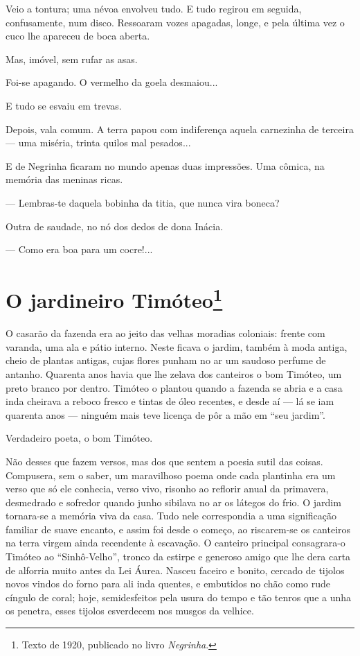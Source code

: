 Veio a tontura; uma névoa envolveu tudo. E tudo regirou em seguida,
confusamente, num disco. Ressoaram vozes apagadas, longe, e pela última
vez o cuco lhe apareceu de boca aberta.

Mas, imóvel, sem rufar as asas.

Foi-se apagando. O vermelho da goela desmaiou...

E tudo se esvaiu em trevas.

Depois, vala comum. A terra papou com indiferença aquela carnezinha de
terceira --- uma miséria, trinta quilos mal pesados...

E de Negrinha ficaram no mundo apenas duas impressões. Uma cômica, na
memória das meninas ricas.

--- Lembras-te daquela bobinha da titia, que nunca vira boneca?

Outra de saudade, no nó dos dedos de dona Inácia.

--- Como era boa para um cocre!...

\chapter{O jardineiro Timóteo\footnote[*]{Texto de 1920, publicado no livro \emph{Negrinha}.}}


O casarão da fazenda era ao jeito das velhas moradias coloniais: frente
com varanda, uma ala e pátio interno. Neste ficava o jardim, também à
moda antiga, cheio de plantas antigas, cujas flores punham no ar um
saudoso perfume de antanho. Quarenta anos havia que lhe zelava dos
canteiros o bom Timóteo, um preto branco por dentro. Timóteo o plantou
quando a fazenda se abria e a casa inda cheirava a reboco fresco e
tintas de óleo recentes, e desde aí --- lá se iam quarenta anos ---
ninguém mais teve licença de pôr a mão em ``seu jardim''.

Verdadeiro poeta, o bom Timóteo.

Não desses que fazem versos, mas dos que sentem a poesia sutil das
coisas. Compusera, sem o saber, um maravilhoso poema onde cada plantinha
era um verso que só ele conhecia, verso vivo, risonho ao reflorir anual
da primavera, desmedrado e sofredor quando junho sibilava no ar os
látegos do frio. O jardim tornara-se a memória viva da casa. Tudo nele
correspondia a uma significação familiar de suave encanto, e assim foi
desde o começo, ao riscarem-se os canteiros na terra virgem ainda
recendente à escavação. O canteiro principal consagrara-o Timóteo ao
``Sinhô-Velho'', tronco da estirpe e generoso amigo que lhe dera carta
de alforria muito antes da Lei Áurea. Nasceu faceiro e bonito, cercado
de tijolos novos vindos do forno para ali inda quentes, e embutidos no
chão como rude cíngulo de coral; hoje, semidesfeitos pela usura do tempo
e tão tenros que a unha os penetra, esses tijolos esverdecem nos musgos
da velhice.

